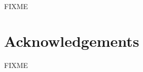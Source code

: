 \documentclass{../templates/www2008-submission}
\begin{document}
FIXME

\section*{Acknowledgements}

FIXME





\balancecolumns
\end{document}
